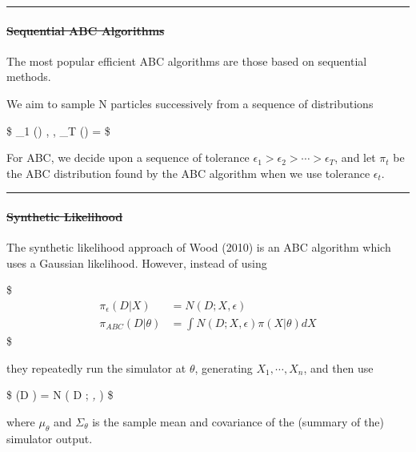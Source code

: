 \documentclass[
]{book}
\begin{document}
\begin{center}\rule{0.5\linewidth}{0.5pt}\end{center}

\hypertarget{sequential-abc-algorithms}{%
\paragraph{\texorpdfstring{\sout{Sequential ABC Algorithms}}{Sequential ABC Algorithms}}\label{sequential-abc-algorithms}}

The most popular efficient ABC algorithms are those based on sequential methods.

We aim to sample N particles successively from a sequence of distributions

\$
\pi\_1 (\theta) , \cdots, \pi\_T (\theta) = 
\$

For ABC, we decide upon a sequence of tolerance \(\epsilon_1 >\epsilon_2 > \cdots > \epsilon_T\), and let \(\pi_t\) be the ABC distribution found by the ABC algorithm when we use tolerance \(\epsilon_t\).

\begin{center}\rule{0.5\linewidth}{0.5pt}\end{center}

\hypertarget{synthetic-likelihood}{%
\paragraph{\texorpdfstring{\sout{Synthetic Likelihood}}{Synthetic Likelihood}}\label{synthetic-likelihood}}

The synthetic likelihood approach of Wood (2010) is an ABC algorithm which uses a Gaussian likelihood. However, instead of using

\$
\begin{align}

\pi_\epsilon(D \vert X) &= N(D; X, \epsilon) \\
\pi_{ABC}(D \vert \theta)  &= \int N(D; X, \epsilon)\pi(X \vert \theta) dX

\end{align}
\$

they repeatedly run the simulator at \(\theta\), generating \(X_1, \cdots, X_n\), and then use

\$
\pi(D \vert \theta) = N \left( D ; \mu\emph{\theta , \Sigma}\theta \right)
\$

where \(\mu_\theta\) and \(\Sigma_\theta\) is the sample mean and covariance of the (summary of the) simulator output.
\end{document}
